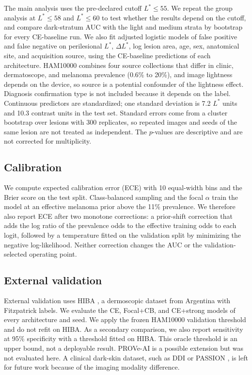 \documentclass[11pt]{article}
\begin{document}
The main analysis uses the pre-declared cutoff $L^*\leq55$. We repeat the group analysis at $L^*\leq58$ and $L^*\leq60$ to test whether the results depend on the cutoff, and compare dark-stratum AUC with the light and medium strata by bootstrap for every CE-baseline run. We also fit adjusted logistic models of false positive and false negative on perilesional $L^*$, $\Delta L^*$, log lesion area, age, sex, anatomical site, and acquisition source, using the CE-baseline predictions of each architecture. HAM10000 combines four source collections that differ in clinic, dermatoscope, and melanoma prevalence (0.6\% to 20\%), and image lightness depends on the device, so source is a potential confounder of the lightness effect. Diagnosis confirmation type is not included because it depends on the label. Continuous predictors are standardized; one standard deviation is 7.2 $L^*$ units and 10.3 contrast units in the test set. Standard errors come from a cluster bootstrap over lesions with 300 replicates, so repeated images and seeds of the same lesion are not treated as independent. The $p$-values are descriptive and are not corrected for multiplicity.

\subsection{Calibration}

We compute expected calibration error (ECE) with 10 equal-width bins and the Brier score on the test split. Class-balanced sampling and the focal $\alpha$ train the model at an effective melanoma prior above the 11\% prevalence. We therefore also report ECE after two monotone corrections: a prior-shift correction that adds the log ratio of the prevalence odds to the effective training odds to each logit, followed by a temperature fitted on the validation split by minimizing the negative log-likelihood. Neither correction changes the AUC or the validation-selected operating point.

\subsection{External validation}

External validation uses HIBA \citep{hiba2023}, a dermoscopic dataset from Argentina with Fitzpatrick labels. We evaluate the CE, Focal+CB, and CE+strong models of every architecture and seed. We apply the frozen HAM10000 validation threshold and do not refit on HIBA. As a secondary comparison, we also report sensitivity at 95\% specificity with a threshold fitted on HIBA. This oracle threshold is an upper bound, not a deployable result. PROVe-AI \citep{proveai2023} is a possible extension but was not evaluated here. A clinical dark-skin dataset, such as DDI \citep{daneshjou2022ddi} or PASSION \citep{passion2024}, is left for future work because of the imaging modality difference.
\end{document}
